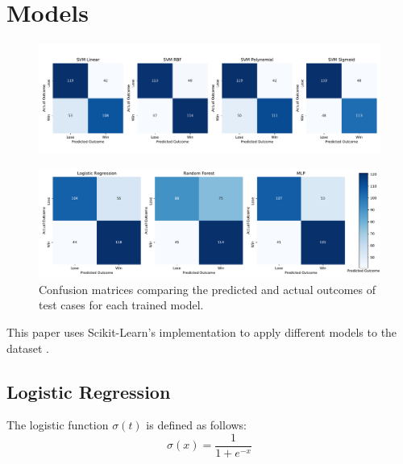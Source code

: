 \section{Models} \label{sec:models}
\begin{figure}[ht]

\centering

\includegraphics[width=18cm]{plots/confusionmatricesr1.pdf}


\label{confusionmatricesr1}
\end{figure}
\begin{figure}[ht]
\vspace{-2em}
\centering
\includegraphics[width=14cm]{plots/confusionmatricesr2.pdf}

\caption{Confusion matrices comparing the predicted and actual outcomes of test cases for each trained model.}

\label{fig:confusionmatrices}
\centering
\end{figure}

This paper uses Scikit-Learn's implementation to apply different models to the dataset \cite{pedregosa2011scikit}.

\subsection{Logistic Regression}
The logistic function $\sigma(t)$ is defined as follows:
\begin{equation}
    \sigma(x) = \frac{1}{1+e^{-x}}
\end{equation}

